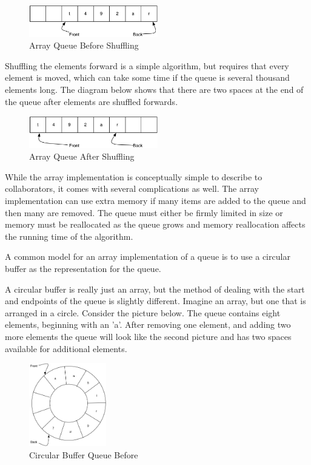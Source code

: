 \begin{figure}[H]
\centering
\includegraphics[width=0.5\textwidth]{pictures/arrayQueue2.jpg}
\caption{Array Queue Before Shuffling}
\label{fig:arrayQueue2}
\end{figure}

Shuffling the elements forward is a simple algorithm, but requires that every element is moved, which can take some time if the queue is several thousand elements long. The diagram below shows that there are two spaces at the end of the queue after elements are shuffled forwards.


\begin{figure}[H]
\centering
\includegraphics[width=0.5\textwidth]{pictures/arrayQueue3.jpg}
\caption{Array Queue After Shuffling}
\label{fig:arrayQueue3}
\end{figure}



While the array implementation is conceptually simple to describe to collaborators, it comes with several complications as well.  The array implementation can use extra memory if many items are added to the queue and then many are removed.  The queue must either be firmly limited in size or memory must be reallocated as the queue grows and memory reallocation affects the running time of the algorithm.

A common model for an array implementation of a queue is to use a circular buffer as the representation for the queue.

A circular buffer is really just an array, but the method of dealing  with the start and endpoints of the queue is slightly different. Imagine an array, but one that is arranged in a circle. Consider the picture below. The queue contains eight elements, beginning with an 'a'. After removing one element, and adding two more elements the queue will look like the second picture and has two spaces available for additional elements.

\begin{figure}[H]
\centering
\includegraphics[width=0.3\textwidth]{pictures/circularbufferone.jpg}
\caption{Circular Buffer Queue Before}
\label{fig:circleQueue1}
\end{figure}

